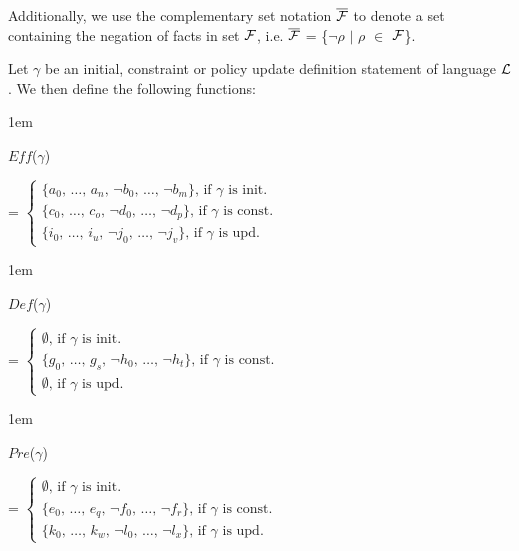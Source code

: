 \documentclass[11pt, twocolumn]{article}
\newenvironment{vquote}
  {\begin{list}{}{\leftmargin 1em}\item[]}
  {\end{list}}
\begin{document}
    Additionally, we use the complementary set notation
    $\overline{{\cal F}}$ to denote a set containing the negation of
    facts in set ${\cal F}$, i.e. $\overline{{\cal F}}$ =
    \{$\lnot\rho$ $\mid$ $\rho$ $\in$ ${\cal F}$\}.

    Let $\gamma$ be an initial, constraint or policy update definition
    statement of language ${\cal L}$. We then define the following functions:

    \begin{vquote}
      $Eff$($\gamma$)

      =
      \begin{math}
        \begin{cases}
          \mbox{\{$a_{0}$, \ldots, $a_{n}$, $\lnot$$b_{0}$, \ldots, $\lnot$$b_{m}$\}, if $\gamma$ is init.} \\
          \mbox{\{$c_{0}$, \ldots, $c_{o}$, $\lnot$$d_{0}$, \ldots, $\lnot$$d_{p}$\}, if $\gamma$ is const.} \\
          \mbox{\{$i_{0}$, \ldots, $i_{u}$, $\lnot$$j_{0}$, \ldots, $\lnot$$j_{v}$\}, if $\gamma$ is upd.}
        \end{cases}
      \end{math}
    \end{vquote}

    \begin{vquote}
      $Def$($\gamma$)

      =
      \begin{math}
        \begin{cases}
          \mbox{$\emptyset$, if $\gamma$ is init.} \\
          \mbox{\{$g_{0}$, \ldots, $g_{s}$, $\lnot$$h_{0}$, \ldots, $\lnot$$h_{t}$\}, if $\gamma$ is const.} \\
          \mbox{$\emptyset$, if $\gamma$ is upd.}
        \end{cases}
      \end{math}
    \end{vquote}

    \begin{vquote}
      $Pre$($\gamma$)

      =
      \begin{math}
        \begin{cases}
          \mbox{$\emptyset$, if $\gamma$ is init.} \\
          \mbox{\{$e_{0}$, \ldots, $e_{q}$, $\lnot$$f_{0}$, \ldots, $\lnot$$f_{r}$\}, if $\gamma$ is const.} \\
          \mbox{\{$k_{0}$, \ldots, $k_{w}$, $\lnot$$l_{0}$, \ldots, $\lnot$$l_{x}$\}, if $\gamma$ is upd.}
        \end{cases}
      \end{math}
    \end{vquote}
\end{document}
